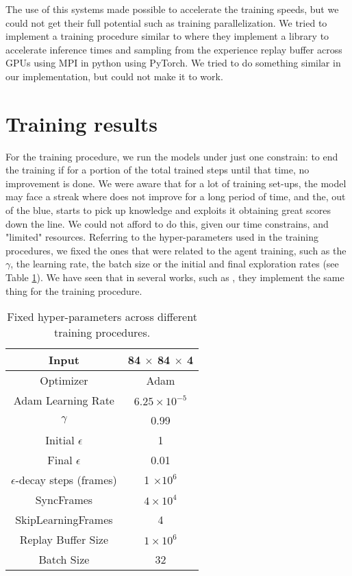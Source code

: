 The use of this systems made possible to accelerate the training speeds, but we could not get their full potential such as training parallelization. We tried to implement a training procedure similar to \cite{stooke2019rlpyt} where they implement a library to accelerate inference times and sampling from the experience replay buffer across GPUs using MPI \cite{gropp_using_1994} in python using PyTorch. We tried to do something similar in our implementation, but could not make it to work.

\section{Training results}
\label{sec:env_setup}

For the training procedure, we run the models under just one constrain: to end the training if for a portion of the total trained steps until that time, no improvement is done. We were aware that for a lot of training set-ups, the model may face a streak where does not improve for a long period of time, and the, out of the blue, starts to pick up knowledge and exploits it obtaining great scores down the line. We could not afford to do this, given our time constrains, and "limited" resources. Referring to the hyper-parameters used in the training procedures, we fixed the ones that were related to the agent training, such as the $\gamma$, the learning rate, the batch size or the initial and final exploration rates (see Table \ref{tab:hyper-parameters}). We have seen that in several works, such as \cite{vanhasselt2015deep, hessel2017rainbow, meng2024deep}, they implement the same thing for the training procedure.

\begin{table}[!h]
	\begin{center}
		\caption[Sample table (short title)]{Fixed hyper-parameters across different training procedures.}
		\label{tab:hyper-parameters}
		\begin{tabular}{||c | c||} 
			\hline
			Input & 84 $\times$ 84 $\times$ 4 \\
			\hline
			Optimizer & Adam \\
			\hline
			Adam Learning Rate & $6.25 \times 10^{-5}$ \\
			\hline
			$\gamma$ & 0.99 \\
			\hline
			Initial $\epsilon$ & 1 \\
			\hline
			Final $\epsilon$ & 0.01 \\
			\hline
			$\epsilon$-decay steps (frames) & 1 $\times 10^6$   \\
			\hline
			SyncFrames & $4 \times 10^4$ \\
			\hline
			SkipLearningFrames & 4 \\
			\hline
			Replay Buffer Size & $1 \times 10^{6}$ \\
			\hline
			Batch Size & 32 \\
			\hline
		\end{tabular}
	\end{center}
\end{table}

